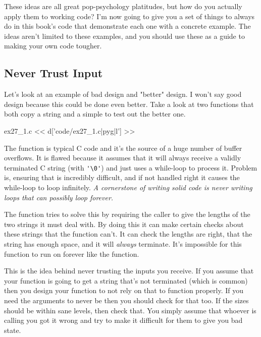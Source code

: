 These ideas are all great pop-psychology platitudes, but how do you actually apply them to working code?
I'm now going to give you a set of things to always do in this book's code that demonstrate each
one with a concrete example.  The ideas aren't limited to these examples, and you should use these as
a guide to making your own code tougher.


\subsection{Never Trust Input}

Let's look at an example of bad design and "better" design.  I won't say good
design because this could be done even better.  Take a look at two functions
that both copy a string and a simple  to test out the better one.

\begin{code}{ex27\_1.c}
<< d['code/ex27_1.c|pyg|l'] >>
\end{code}

The  function is typical C code and it's the source of a huge number
of buffer overflows.  It is flawed because it assumes that it will always receive
a validly terminated C string (with \verb|'\0'|) and just uses a while-loop to
process it.  Problem is, ensuring that is incredibly difficult, and if not handled
right it causes the while-loop to loop infinitely.  \emph{A cornerstone of 
writing solid code is never writing loops that can possibly loop forever.}

The  function tries to solve this by requiring the caller to
give the lengths of the two strings it must deal with.  By doing this it can make
certain checks about these strings that the  function can't.  It
can check the lengths are right, that the  string has enough space,
and it will \emph{always} terminate.  It's impossible for this function to
run on forever like the  function.

This is the idea behind never trusting the inputs you receive.  If you assume
that your function is going to get a string that's not terminated (which is common)
then you design your function to not rely on that to function properly.  If you
need the arguments to never be  then you should check for that too.
If the sizes should be within sane levels, then check that.  You simply assume that
whoever is calling you got it wrong and try to make it difficult for them to
give you bad state.


